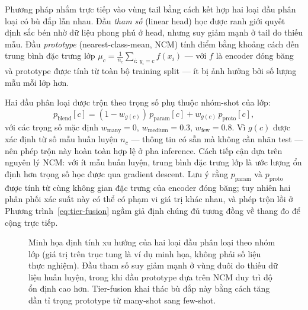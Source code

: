Phương pháp nhắm trực tiếp vào vùng tail bằng cách kết hợp hai loại
đầu phân loại có bù đắp lẫn nhau.
Đầu \emph{tham số} (linear head) học được ranh giới quyết định sắc bén
nhờ dữ liệu phong phú ở head, nhưng suy giảm mạnh ở tail do thiếu mẫu.
Đầu \emph{prototype} (nearest-class-mean, NCM) tính điểm bằng khoảng cách
đến trung bình đặc trưng lớp $\mu_c = \frac{1}{n_c}\sum_{i:\,y_i=c} f(x_i)$
--- với $f$ là encoder đóng băng và prototype được tính từ toàn bộ training split ---
ít bị ảnh hưởng bởi số lượng mẫu mỗi lớp hơn.
 
Hai đầu phân loại được trộn theo trọng số phụ thuộc nhóm-shot của lớp:
\begin{equation}
    p_{\text{blend}}[c]
    = (1 - w_{g(c)})\,p_{\text{param}}[c]
    + w_{g(c)}\,p_{\text{proto}}[c],
    \label{eq:tier-fusion}
\end{equation}
với các trọng số mặc định
$w_{\text{many}} {=} 0$, $w_{\text{medium}} {=} 0.3$, $w_{\text{few}} {=} 0.8$.
Vì $g(c)$ được xác định từ số mẫu huấn luyện $n_c$ --- thông tin có sẵn
mà không cần nhãn test --- nên phép trộn này hoàn toàn hợp lệ ở pha inference.
Cách tiếp cận dựa trên nguyên lý NCM: với ít mẫu huấn luyện,
trung bình đặc trưng lớp là ước lượng ổn định hơn trọng số học được
qua gradient descent.
Lưu ý rằng $p_{\text{param}}$ và $p_{\text{proto}}$ được tính từ cùng không gian
đặc trưng của encoder đóng băng; tuy nhiên hai phân phối xác suất này có thể
có phạm vi giá trị khác nhau, và phép trộn lồi ở Phương trình~\eqref{eq:tier-fusion}
ngầm giả định chúng đủ tương đồng về thang đo để cộng trực tiếp.
 
\begin{figure}[H]
\centering
{}
\caption{Minh họa định tính xu hướng của hai loại đầu phân loại theo nhóm lớp
(giá trị trên trục tung là ví dụ minh họa, không phải số liệu thực nghiệm).
Đầu tham số suy giảm mạnh ở vùng đuôi do thiếu dữ liệu huấn luyện,
trong khi đầu prototype dựa trên NCM duy trì độ ổn định cao hơn.
Tier-fusion khai thác bù đắp này bằng cách tăng dần tỉ trọng prototype
từ many-shot sang few-shot.}
\label{fig:tier-fusion-intuition}
\end{figure}
 
